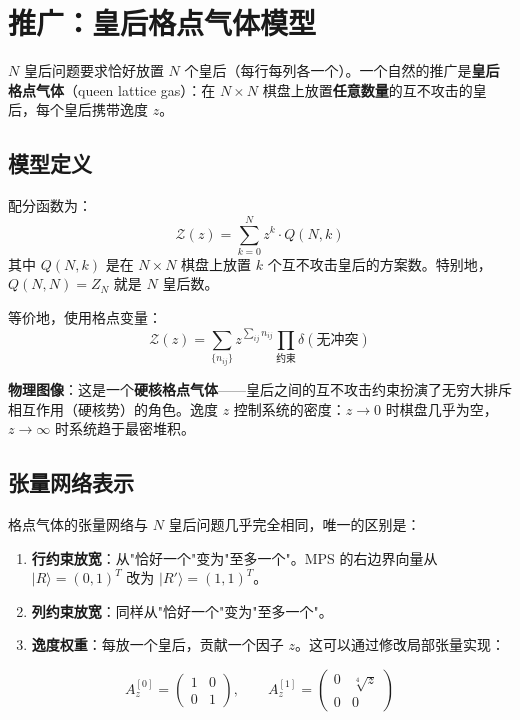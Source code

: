 \documentclass[12pt,a4paper]{ctexart}
\begin{document}
\section{推广：皇后格点气体模型}

$N$ 皇后问题要求恰好放置 $N$ 个皇后（每行每列各一个）。一个自然的推广是\textbf{皇后格点气体}（queen lattice gas）：在 $N \times N$ 棋盘上放置\textbf{任意数量}的互不攻击的皇后，每个皇后携带逸度 $z$。

\subsection{模型定义}

配分函数为：
\begin{equation}
\boxed{
\mathcal{Z}(z) = \sum_{k=0}^{N} z^k \cdot Q(N, k)
}
\end{equation}
其中 $Q(N, k)$ 是在 $N \times N$ 棋盘上放置 $k$ 个互不攻击皇后的方案数。特别地，$Q(N, N) = Z_N$ 就是 $N$ 皇后数。

等价地，使用格点变量：
\begin{equation}
\mathcal{Z}(z) = \sum_{\{n_{ij}\}} z^{\sum_{ij} n_{ij}} \prod_{\text{约束}} \delta(\text{无冲突})
\end{equation}

\textbf{物理图像}：这是一个\textbf{硬核格点气体}——皇后之间的互不攻击约束扮演了无穷大排斥相互作用（硬核势）的角色。逸度 $z$ 控制系统的密度：$z \to 0$ 时棋盘几乎为空，$z \to \infty$ 时系统趋于最密堆积。

\subsection{张量网络表示}

格点气体的张量网络与 $N$ 皇后问题几乎完全相同，唯一的区别是：

\begin{enumerate}
    \item \textbf{行约束放宽}：从"恰好一个"变为"至多一个"。MPS 的右边界向量从 $|R\rangle = (0,1)^T$ 改为 $|R'\rangle = (1,1)^T$。
    \item \textbf{列约束放宽}：同样从"恰好一个"变为"至多一个"。
    \item \textbf{逸度权重}：每放一个皇后，贡献一个因子 $z$。这可以通过修改局部张量实现：
\end{enumerate}

\begin{equation}
A_z^{[0]} = \begin{pmatrix} 1 & 0 \\ 0 & 1 \end{pmatrix}, \qquad
A_z^{[1]} = \begin{pmatrix} 0 & \sqrt[4]{z} \\ 0 & 0 \end{pmatrix}
\end{equation}
\end{document}

